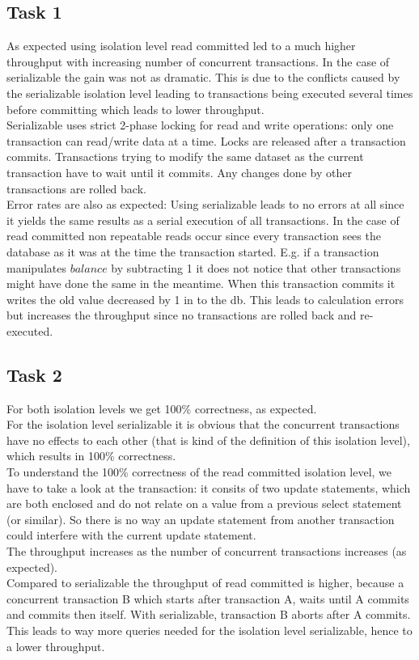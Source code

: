 \documentclass[11pt]{scrartcl}
\begin{document}
\subsection*{Task 1}
As expected using isolation level read committed led to a much higher throughput with increasing number of concurrent transactions. In the case of serializable the gain was not as dramatic. This is due to the conflicts caused by the serializable isolation level leading to transactions being executed several times before committing which leads to lower throughput.\\

Serializable uses strict 2-phase locking for read and write operations: only one transaction can read/write data at a time. Locks are released after a transaction commits. Transactions trying to modify the same dataset as the current transaction have to wait until it commits. Any changes done by other transactions are rolled back. \\

Error rates are also as expected: Using serializable leads to no errors at all since it yields the same results as a serial execution of all transactions. In the case of read committed non repeatable reads occur since every transaction sees the database as it was at the time the transaction started. E.g. if a transaction manipulates $balance$ by subtracting 1 it does not notice that other transactions might have done the same in the meantime. When this transaction commits it writes the old value decreased by 1 in to the db. This leads to calculation errors but increases the throughput since no transactions are rolled back and re-executed.

\subsection*{Task 2}

For both isolation levels we get 100\% correctness, as expected.\\
For the isolation level serializable it is obvious that the concurrent transactions have no effects to each other (that is kind of the definition of this isolation level), which results in 100\% correctness.\\
To understand the 100\% correctness of the read committed isolation level, we have to take a look at the transaction: it consits of two update statements, which are both enclosed and do not relate on a value from a previous select statement (or similar). So there is no way an update statement from another transaction could interfere with the current update statement.\\
The throughput increases as the number of concurrent transactions increases (as expected).\\
Compared to serializable the throughput of read committed is higher, because a concurrent transaction B which starts after transaction A, waits until A commits and commits then itself. With serializable, transaction B aborts after A commits. This leads to way more queries needed for the isolation level serializable, hence to a lower throughput.
\end{document}
